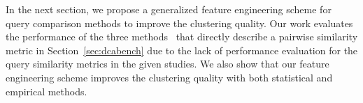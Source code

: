In the next section, we propose a generalized feature engineering scheme for query comparison methods to improve the clustering quality.
Our work evaluates the performance of the three methods~\cite{aouiche2006, aligon2014similarity, makiyama2015text} that directly describe a pairwise similarity metric in Section~\ref{sec:dcabench} due to the lack of performance evaluation for the query similarity metrics in the given studies.
We also show that our feature engineering scheme improves the clustering quality with both statistical and empirical methods.